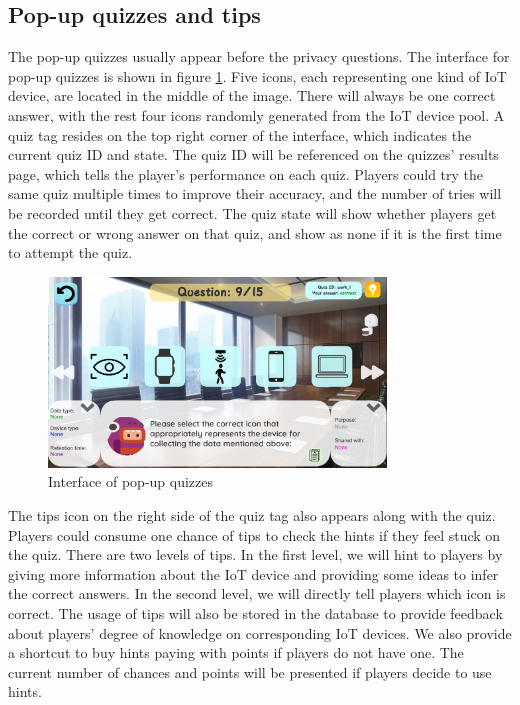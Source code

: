 \documentclass[msc,deptreport,ai]{infthesis}      %
\begin{document}
\subsection{Pop-up quizzes and tips}
\label{section:quiz}
The pop-up quizzes usually appear before the privacy questions. The interface for pop-up quizzes is shown in figure \ref{fig:quiz}. Five icons, each representing one kind of IoT device, are located in the middle of the image. There will always be one correct answer, with the rest four icons randomly generated from the IoT device pool. A quiz tag resides on the top right corner of the interface, which indicates the current quiz ID and state. The quiz ID will be referenced on the quizzes' results page, which tells the player's performance on each quiz. Players could try the same quiz multiple times to improve their accuracy, and the number of tries will be recorded until they get correct. The quiz state will show whether players get the correct or wrong answer on that quiz, and show as none if it is the first time to attempt the quiz.

\begin{figure}
    \centering
    \includegraphics[width=0.8\textwidth]{Quiz.png}
    \caption{Interface of pop-up quizzes}
    \label{fig:quiz}
\end{figure} 

The tips icon on the right side of the quiz tag also appears along with the quiz. Players could consume one chance of tips to check the hints if they feel stuck on the quiz. There are two levels of tips. In the first level, we will hint to players by giving more information about the IoT device and providing some ideas to infer the correct answers. In the second level, we will directly tell players which icon is correct. The usage of tips will also be stored in the database to provide feedback about players' degree of knowledge on corresponding IoT devices. We also provide a shortcut to buy hints paying with points if players do not have one. The current number of chances and points will be presented if players decide to use hints.
\end{document}
